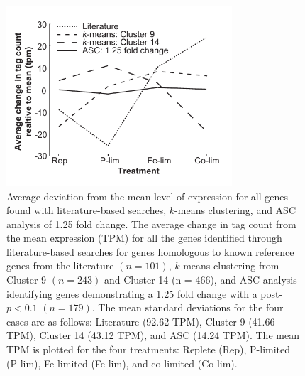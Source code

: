 \begin{figure}[p!]
  \centering
    \includegraphics[width=0.75\textwidth]{Images/C2_Figure2_v6.pdf}
    \caption[Average deviation from the mean level of expression for putative reference genes]{Average deviation from the mean level of expression for all genes found with literature-based searches, $k$-means clustering, and ASC analysis of 1.25 fold change. The average change in tag count from the mean expression (TPM) for all the genes identified through literature-based searches for genes homologous to known reference genes from the literature $(n = 101)$, $k$-means clustering from Cluster 9 $(n = 243)$ and Cluster 14 (n = 466), and ASC analysis identifying genes demonstrating a 1.25 fold change with a post-$p < 0.1$ $(n = 179)$. The mean standard deviations for the four cases are as follows: Literature (92.62 TPM), Cluster 9 (41.66 TPM), Cluster 14 (43.12 TPM), and ASC (14.24 TPM). The mean TPM is plotted for the four treatments: Replete (Rep), P-limited (P-lim), Fe-limited (Fe-lim), and co-limited (Co-lim).}
  \label{fig:c2f2}
\end{figure}

